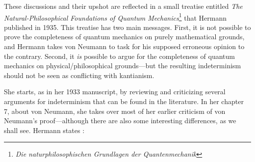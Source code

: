\documentclass[11pt]{article}
\begin{document}
These discussions and their upshot are reflected in a small treatise entitled \emph{The Natural-Philosophical Foundations of Quantum Mechanics}\footnote{\emph{Die naturphilosophischen Grundlagen der Quantenmechanik}} \cite{hermann1} that Hermann published in 1935. This treatise has two main messages. First, it is not possible to prove the completeness of quantum mechanics on purely mathematical grounds, and Hermann takes von Neumann to task for his supposed erroneous opinion to the contrary. Second, it \emph{is} possible to argue for the completeness of quantum mechanics on physical/philosophical grounds---but the resulting indeterminism should not be seen as conflicting with kantianism.

She starts, as in her 1933 manuscript, by reviewing and criticizing several arguments for indeterminism that can be found in the literature. In her chapter 7, about von Neumann, she takes over most of her earlier criticism of von Neumann's proof---although there are also some interesting differences, as we shall see. Hermann states \cite[pp.\@ 208--209]{crull}:
\end{document}
